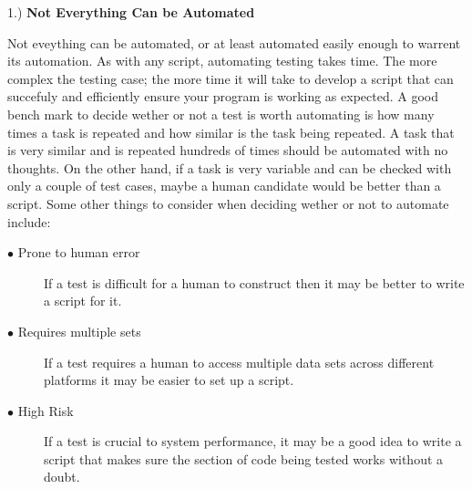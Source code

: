 1.) \textbf{Not Everything Can be Automated}
\begin{adjustwidth}{3.5em}{0pt}
  Not eveything can be automated, or at least automated easily enough to warrent its automation. As with any script, automating testing takes time. The more complex the testing case; the more time it will take to develop a script that can succefuly and efficiently ensure your program is working as expected. A good bench mark to decide wether or not a test is worth automating is how many times a task is repeated and how similar is the task being repeated. A task that is very similar and is repeated hundreds of times should be automated with no thoughts. On the other hand, if a task is very variable and can be checked with only a couple of test cases, maybe a human candidate would be better than a script. Some other things to consider when deciding wether or not to automate include: \newline

  \begin{description}
    \item [$\bullet$ Prone to human error] If a test is difficult for a human to construct then it may be better to write a script for it.
    \item [$\bullet$ Requires multiple sets] If a test requires a human to access multiple data sets across different platforms it may be easier to set up a script.
    \item [$\bullet$ High Risk] If a test is crucial to system performance, it may be a good idea to write a script that makes sure the section of code being tested works without a doubt.
  \end{description}
\end{adjustwidth}

\vspace{10mm}

